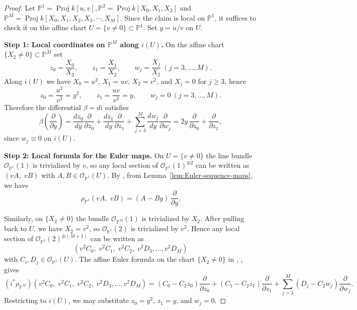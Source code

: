 \documentclass[11pt,twoside]{amsart}
\theoremstyle{plain}
\numberwithin{equation}{section}
\theoremstyle{definition}
\newcommand{\PP}{\mathbb{P}}
\newcommand{\OO}{\mathcal{O}}
\begin{document}
\begin{proof}
Let $\mathbb{P}^1 = \operatorname{Proj}k[u,v], \mathbb{P}^2 = \operatorname{Proj}k[X_0,X_1,X_2]$ and $\mathbb{P}^M = \operatorname{Proj}k[X_0,X_1,X_2,X_3,\cdots, X_M]$.  Since the claim is local on $\PP^1$, it suffices to check it on the affine chart
$U=\{v\neq 0\}\subset \PP^1$.  Set $y=u/v$ on $U$.

\medskip
\noindent\textbf{Step 1: Local coordinates on $\PP^M$ along $i(U)$.}
On the affine chart $\{X_2\neq 0\}\subset \PP^M$ set
\[
z_0=\frac{X_0}{X_2},\qquad z_1=\frac{X_1}{X_2},\qquad w_j=\frac{X_j}{X_2}\ (j=3,\dots,M).
\]
Along $i(U)$ we have $X_0=u^2$, $X_1=uv$, $X_2=v^2$, and $X_j=0$ for $j\ge 3$, hence
\[
z_0=\frac{u^2}{v^2}=y^2,\qquad z_1=\frac{uv}{v^2}=y,\qquad w_j=0\ (j=3,\dots,M).
\]
Therefore the differential $\beta=di$ satisfies
\begin{equation}\label{eq:beta-local-PM}
\beta\!\left(\frac{\partial}{\partial y}\right)
=
\frac{d z_0}{d y}\frac{\partial}{\partial z_0}
+\frac{d z_1}{d y}\frac{\partial}{\partial z_1}
+\sum_{j=3}^M \frac{d w_j}{d y}\frac{\partial}{\partial w_j}
=
2y\,\frac{\partial}{\partial z_0}+\frac{\partial}{\partial z_1},
\end{equation}
since $w_j\equiv 0$ on $i(U)$.

\medskip
\noindent\textbf{Step 2: Local formula for the Euler maps.}
On $U=\{v\neq 0\}$ the line bundle $\OO_{\PP^1}(1)$ is trivialized by $v$, so any local
section of $\OO_{\PP^1}(1)^{\oplus 2}$ can be written as $(vA,\;vB)$ with
$A,B\in \OO_{\PP^1}(U)$.  By , from Lemma~\ref{lem:Euler-sequence-maps}, we have
\begin{equation}\label{eq:rhoP1-local-PM}
\rho_{\PP^1}(vA,\;vB)=(A-By)\,\frac{\partial}{\partial y}.
\end{equation}

Similarly, on $\{X_2\neq 0\}$ the bundle $\OO_{\PP^M}(1)$ is trivialized by $X_2$.
After pulling back to $U$, we have $X_2=v^2$, so $\OO_{\PP^1}(2)$ is trivialized by $v^2$.
Hence any local section of $\OO_{\PP^1}(2)^{\oplus (M+1)}$ can be written as
\[
(v^2C_0,\;v^2C_1,\;v^2C_2,\;v^2D_3,\dots,v^2D_M)
\]
with $C_i,D_j\in \OO_{\PP^1}(U)$.  The affine Euler formula on the chart $\{X_2\neq 0\}$ in , ,
gives
\begin{equation}\label{eq:rhoPM-local}
(i^*\rho_{\PP^M})(v^2C_0,\;v^2C_1,\;v^2C_2,\;v^2D_3,\dots,v^2D_M)
=
(C_0-C_2 z_0)\frac{\partial}{\partial z_0}
+(C_1-C_2 z_1)\frac{\partial}{\partial z_1}
+\sum_{j=3}^M (D_j-C_2 w_j)\frac{\partial}{\partial w_j}.
\end{equation}
Restricting to $i(U)$, we may substitute $z_0=y^2$, $z_1=y$, and $w_j=0$.


\end{proof}
\end{document}
